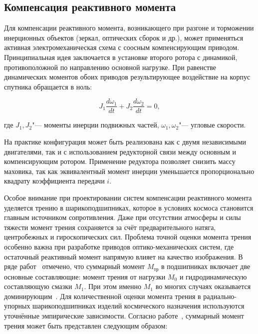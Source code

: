 \subsection{Компенсация реактивного момента}

Для компенсации реактивного момента, возникающего при разгоне и торможении инерционных объектов (зеркал, оптических сборок и др.), может применяться активная электромеханическая схема с соосным компенсирующим приводом. Принципиальная идея заключается в установке второго ротора с динамикой, противоположной по направлению основной нагрузке. При равенстве динамических моментов обоих приводов результирующее воздействие на корпус спутника обращается в ноль:

\begin{equation}
	\label{eq:equal_inertia}
	J_1\frac{d\omega_1}{dt}+J_2\frac{d\omega_2}{dt} = 0,
\end{equation}


\noindent где \(J_1,J_2\)"--- моменты инерции подвижных частей, \(\omega_1,\omega_2\)"--- угловые скорости.

На практике конфигурация может быть реализована как с двумя независимыми двигателями, так и с использованием редукторной связи между основным и компенсирующим ротором. Применение редуктора позволяет снизить массу маховика, так как эквивалентный момент инерции уменьшается пропорционально квадрату коэффициента передачи $i$.

Особое внимание при проектировании систем компенсации реактивного момента уделяется трению в шарикоподшипниках, которое в условиях космоса становится главным источником сопротивления. Даже при отсутствии атмосферы и силы тяжести момент трения сохраняется за счёт предварительного натяга, центробежных и гироскопических сил. Проблема точной оценки момента трения особенно важна при разработке приводов оптико-механических систем, где остаточный реактивный момент напрямую влияет на качество изображения. В ряде работ~\cite{Babaeva1962, Delektorskii1968, Shashanov1971,Yavlensky1981} отмечено, что суммарный момент $M_{\text{тр}}$ в подшипниках включает две основные составляющие: момент трения от нагрузки $M_0$ и гидродинамическую составляющую смазки $M_1$. При этом именно $M_1$ во многих случаях оказывается доминирующим~\cite{Mikhailov2014}. Для количественной оценки момента трения в радиально-упорных шарикоподшипниках изделий космического назначения используются уточнённые эмпирические зависимости. Согласно работе~\cite{Delektorskii1968}, суммарный момент трения может быть представлен следующим образом:

